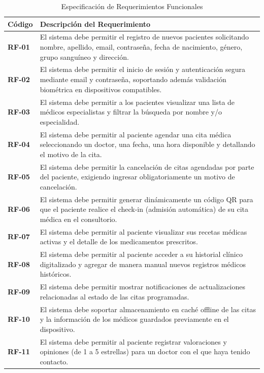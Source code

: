 \documentclass[12pt,a4paper]{report}
\begin{document}
\begin{table}[H]
    \centering
    \caption{Especificación de Requerimientos Funcionales}
    \vspace{0.2cm}
    \small
    \begin{tabular}{p{2cm} p{10cm}}
        \toprule
        \textbf{Código} & \textbf{Descripción del Requerimiento} \\
        \midrule
        \textbf{RF-01} & El sistema debe permitir el registro de nuevos pacientes solicitando nombre, apellido, email, contraseña, fecha de nacimiento, género, grupo sanguíneo y dirección. \\
        \textbf{RF-02} & El sistema debe permitir el inicio de sesión y autenticación segura mediante email y contraseña, soportando además validación biométrica en dispositivos compatibles. \\
        \textbf{RF-03} & El sistema debe permitir a los pacientes visualizar una lista de médicos especialistas y filtrar la búsqueda por nombre y/o especialidad. \\
        \textbf{RF-04} & El sistema debe permitir al paciente agendar una cita médica seleccionando un doctor, una fecha, una hora disponible y detallando el motivo de la cita. \\
        \textbf{RF-05} & El sistema debe permitir la cancelación de citas agendadas por parte del paciente, exigiendo ingresar obligatoriamente un motivo de cancelación. \\
        \textbf{RF-06} & El sistema debe permitir generar dinámicamente un código QR para que el paciente realice el check-in (admisión automática) de su cita médica en el consultorio. \\
        \textbf{RF-07} & El sistema debe permitir al paciente visualizar sus recetas médicas activas y el detalle de los medicamentos prescritos. \\
        \textbf{RF-08} & El sistema debe permitir al paciente acceder a su historial clínico digitalizado y agregar de manera manual nuevos registros médicos históricos. \\
        \textbf{RF-09} & El sistema debe permitir mostrar notificaciones de actualizaciones relacionadas al estado de las citas programadas. \\
        \textbf{RF-10} & El sistema debe soportar almacenamiento en caché offline de las citas y la información de los médicos guardados previamente en el dispositivo. \\
        \textbf{RF-11} & El sistema debe permitir al paciente registrar valoraciones y opiniones (de 1 a 5 estrellas) para un doctor con el que haya tenido contacto. \\

\end{tabular}
\end{table}
\end{document}

